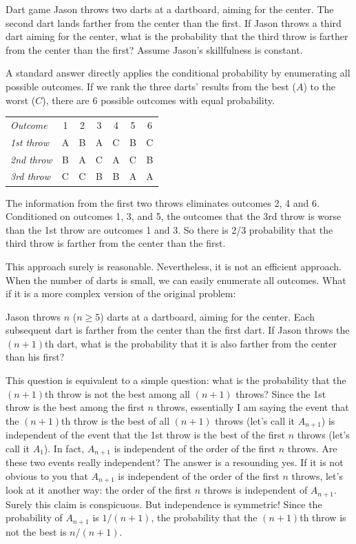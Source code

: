 \begin{problem}{Dart game}
Jason throws two darts at a dartboard, aiming for the center. The second dart lands farther from the center than the first. If Jason throws a third dart aiming for the center, what is the probability that the third throw is farther from the center than the first? Assume Jason's skillfulness is constant.
\end{problem}

\begin{solution}
A standard answer directly applies the conditional probability by enumerating all possible outcomes. If we rank the three darts' results from the best ($A$) to the worst ($C$), there are 6 possible outcomes with equal probability.

\begin{center}
\begin{tabular}{lcccccc}
\emph{Outcome} & 1 & 2 & 3 & 4 & 5 & 6\\
\emph{1st throw} & A & B & A & C & B & C\\
\emph{2nd throw} & B & A & C & A & C & B\\
\emph{3rd throw} & C & C & B & B & A & A\\
\end{tabular}
\end{center}

The information from the first two throws eliminates outcomes 2, 4 and 6. Conditioned on outcomes 1, 3, and 5, the outcomes that the 3rd throw is worse than the 1st throw are outcomes 1 and 3. So there is 2/3 probability that the third throw is farther from the center than the first.

This approach surely is reasonable. Nevertheless, it is not an efficient approach. When the number of darts is small, we can easily enumerate all outcomes. What if it is a more complex version of the original problem:

Jason throws $n$ ($n\geq5$) darts at a dartboard, aiming for the center. Each subsequent dart is farther from the center than the first dart. If Jason throws the $(n+1)$th dart, what is the probability that it is also farther from the center than his first?

This question is equivalent to a simple question: what is the probability that the $(n+1)$th throw is not the best among all $(n+1)$ throws? Since the 1st throw is the best among the first $n$ throws, essentially I am saying the event that the $(n+1)$th throw is the best of all $(n+1)$ throws (let's call it $A_{n+1}$) is independent of the event that the 1st throw is the best of the first $n$ throws (let's call it $A_1$). In fact, $A_{n+1}$ is independent of the order of the first $n$ throws. Are these two events really independent? The answer is a resounding yes. If it is not obvious to you that $A_{n+1}$ is independent of the order of the first $n$ throws, let's look at it another way: the order of the first $n$ throws is independent of $A_{n+1}$. Surely this claim is conspicuous. But independence is symmetric! Since the probability of $A_{n+1}$ is $1/(n+1)$, the probability that the $(n+1)$th throw is not the best is $n/(n+1)$.


\end{solution}
